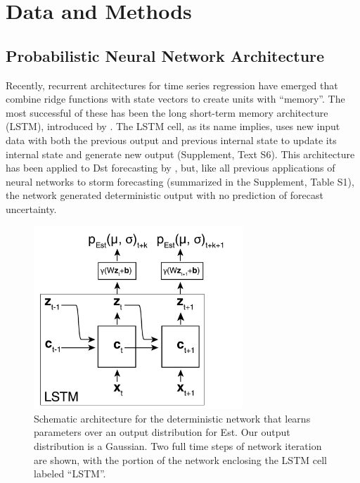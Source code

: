 \documentclass[draft,linenumbers]{agujournal2018}
\begin{document}
\section{Data and Methods}
% 
\subsection{Probabilistic Neural Network Architecture}
Recently, recurrent architectures for time series regression have emerged that combine ridge functions with state vectors to create units with ``memory''. The most successful of these has been the long short-term memory architecture (LSTM), introduced by \cite{Hochreiter1997}. The LSTM cell, as its name implies, uses new input data with both the previous output and previous internal state to update its internal state and generate new output (Supplement, Text S6). This architecture has been applied to Dst forecasting by \cite{Gruet2018}, but, like all previous applications of neural networks to storm forecasting (summarized in the Supplement, Table S1), the network generated deterministic output with no prediction of forecast uncertainty.

\begin{figure}[htbp]
   \centering
   \includegraphics[width=0.7\textwidth]{figures/architecture_prob.pdf} %
   \caption{Schematic architecture for the deterministic network that learns parameters over an output distribution for Est. Our output distribution is a Gaussian. Two full time steps of network iteration are shown, with the portion of the network enclosing the LSTM cell labeled ``LSTM''.}
   \label{fig:architecture}
\end{figure}
\end{document}
